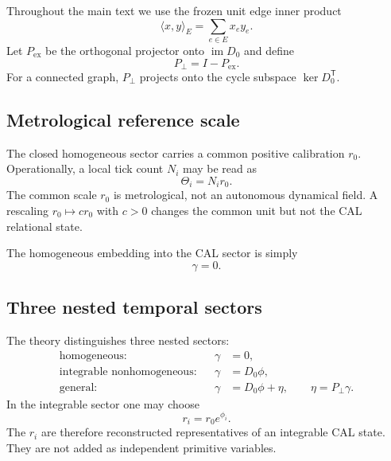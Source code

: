 \documentclass[aip,jmp,amsmath,amssymb,reprint]{revtex4-2}
\newcommand{\imop}{\operatorname{im}}
\newcommand{\kerop}{\operatorname{ker}}
\begin{document}
Throughout the main text we use the frozen unit edge inner product
\begin{equation}
\langle x,y\rangle_E=\sum_{e\in E}x_ey_e.
\label{eq:edge-inner-product}
\end{equation}
Let $P_{\mathrm{ex}}$ be the orthogonal projector onto $\imop D_0$ and define
\begin{equation}
P_\perp=I-P_{\mathrm{ex}}.
\label{eq:projectors}
\end{equation}
For a connected graph, $P_\perp$ projects onto the cycle subspace $\kerop D_0^{\mathsf T}$.

\subsection{Metrological reference scale}

The closed homogeneous sector carries a common positive calibration $r_0$. Operationally, a local tick count $N_i$ may be read as
\begin{equation}
\Theta_i=N_i r_0.
\label{eq:homogeneous-readout}
\end{equation}
The common scale $r_0$ is metrological, not an autonomous dynamical field. A rescaling $r_0\mapsto c r_0$ with $c>0$ changes the common unit but not the CAL relational state.

The homogeneous embedding into the CAL sector is simply
\begin{equation}
\gamma=0.
\label{eq:homogeneous-cal}
\end{equation}

\subsection{Three nested temporal sectors}

The theory distinguishes three nested sectors:
\begin{align}
\text{homogeneous:}&& \gamma&=0,\label{eq:sector-hom}\\
\text{integrable nonhomogeneous:}&& \gamma&=D_0\phi,\label{eq:sector-int}\\
\text{general:}&& \gamma&=D_0\phi+\eta,\qquad \eta=P_\perp\gamma.\label{eq:sector-general}
\end{align}
In the integrable sector one may choose
\begin{equation}
r_i=r_0e^{\phi_i}.
\label{eq:derived-rate}
\end{equation}
The $r_i$ are therefore reconstructed representatives of an integrable CAL state. They are not added as independent primitive variables.
\end{document}
